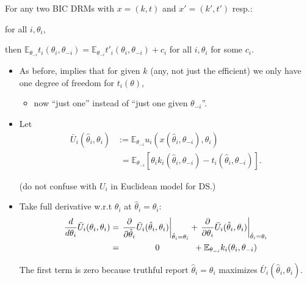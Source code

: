 \documentclass[english,handout]{beamer}		%
\def\lyxframeend{} %
\begin{document}
\begin{theorem}
	For any two BIC DRMs with $x = (k,t)$ and $x' = (k',t')$ resp.:
	 	
	 for all $i,\theta_i$,
	
	\alert{then $\mathbb{E}_{\theta_{-i}} t_i(\theta_i, \theta_{-i}) = \mathbb{E}_{\theta_{-i}} t'_i(\theta_i, \theta_{-i}) + c_i$} for all $i,\theta_i$ for some $c_i$.
\end{theorem}
\begin{itemize}
	\item As before, implies that for given $k$ (any, not just the efficient) we only have one degree of freedom for $t_i(\theta)$,
	\begin{itemize}
		\item now ``just one'' instead of ``just one given $\theta_{-i}$''.
	\end{itemize}
\end{itemize}
\lyxframeend


\begin{itemize}
	\item Let 
	\vspace{-0.5em}\begin{align*}
	\bar{U}_i (\hat{\theta}_i,\theta_i) &:= \mathbb{E}_{\theta_{-i}} u_i \left( x(\hat{\theta}_i, \theta_{-i}), \theta_i \right)
	\\
	&\,\,= \mathbb{E}_{\theta_{-i}} \left[ \theta_i k_i(\hat{\theta}_i, \theta_{-i}) - t_i \left( \hat{\theta}_i, \theta_{-i} \right) \right].
	\end{align*}\vspace{-1em}
	
	(do not confuse with $U_i$ in Euclidean model for DS.)
	\pause
	\item Take full derivative w.r.t $\theta_i$ at $\hat{\theta}_i=\theta_i$:
	\vspace{-0.5em}\begin{align*}
		\frac{d}{d \theta_i} \bar{U}_i (\theta_i,\theta_i) &= \left. \frac{\partial}{\partial \hat{\theta}_i} \bar{U}_i (\hat{\theta}_i,\theta_i) \right|_{\hat{\theta}_i=\theta_i} + \left. \frac{\partial}{\partial \theta_i} \bar{U}_i (\hat{\theta}_i,\theta_i) \right|_{\hat{\theta}_i=\theta_i}
		\\ &= \hspace{1.4cm} 0 \hspace{1.4cm} + \mathbb{E}_{\theta_{-i}} k_i (\theta_i, \theta_{-i})
	\end{align*}\vspace{-1em}
	
	The first term is zero because truthful report $\hat{\theta}_i = \theta_i$ maximizes $\bar{U}_i (\hat{\theta}_i,\theta_i)$.
\end{itemize}
\lyxframeend
\end{document}
